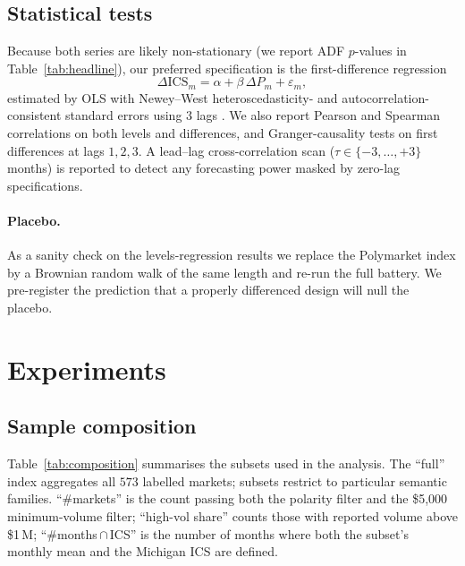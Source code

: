 \documentclass{article}
\begin{document}
\subsection{Statistical tests}
Because both series are likely non-stationary (we report ADF $p$-values
in Table~\ref{tab:headline}), our preferred specification is the
first-difference regression
\[
\Delta \mathrm{ICS}_m = \alpha + \beta\,\Delta P_m + \varepsilon_m,
\]
estimated by OLS with Newey--West heteroscedasticity- and
autocorrelation-consistent standard errors using $3$ lags
\citep{newey1987simple}. We also report Pearson and Spearman correlations
on both levels and differences, and Granger-causality tests on first
differences at lags $1,2,3$. A lead--lag cross-correlation scan
($\tau \in \{-3, \ldots, +3\}$ months) is reported to detect any
forecasting power masked by zero-lag specifications.

\paragraph{Placebo.} As a sanity check on the levels-regression results
we replace the Polymarket index by a Brownian random walk of the same
length and re-run the full battery. We pre-register the prediction
that a properly differenced design will null the placebo.

\section{Experiments}

\subsection{Sample composition}

Table~\ref{tab:composition} summarises the subsets used in the
analysis. The ``full'' index aggregates all $573$ labelled markets;
subsets restrict to particular semantic families. ``\#markets'' is the
count passing both the polarity filter and the \$5{,}000 minimum-volume
filter; ``high-vol share'' counts those with reported volume above
\$1\,M; ``\#months\,$\cap$\,ICS'' is the number of months where both
the subset's monthly mean and the Michigan ICS are defined.
\end{document}
